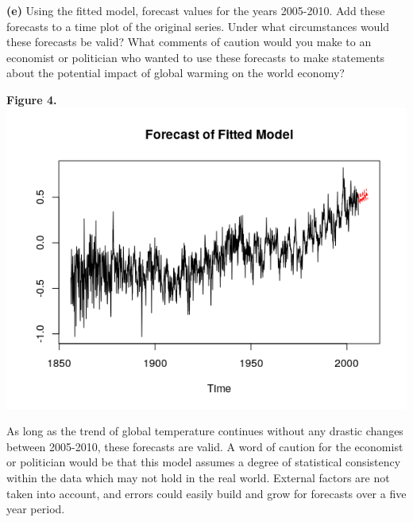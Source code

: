 \documentclass[11pt]{article}
\begin{document}
\textbf{(e)} Using the fitted model, forecast values for the years 2005-2010. Add these forecasts to a time plot of the original series. Under what circumstances would these forecasts be valid? What comments of caution would you make to an economist or politician who wanted to use these forecasts to make statements about the potential impact of global warming on the world economy?
\begin{center}
\textbf{Figure 4.}
\\
\includegraphics[scale=1]{for}
\end{center}
As long as the trend of global temperature continues without any drastic changes between 2005-2010, these forecasts are valid. A word of caution for the economist or politician would be that this model assumes a degree of statistical consistency within the data which may not hold in the real world. External factors are not taken into account, and errors could easily build and grow for forecasts over a five year period.
\end{document}
